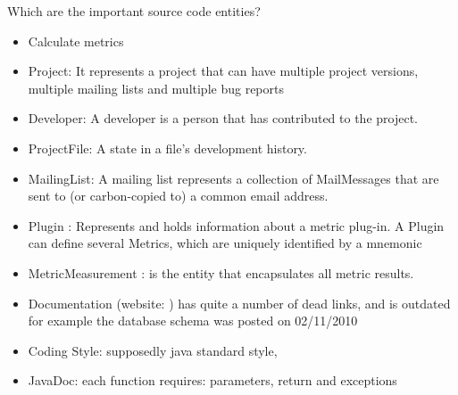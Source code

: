 \documentclass[a4paper,12pt,titlepage]{article}
\begin{document}
Which are the important source code entities?
\begin{itemize}
\item Calculate metrics %
\item Project: It represents a project that can have multiple project versions, multiple mailing lists and multiple bug reports

\item Developer: A developer is a person that has contributed to the project.

\item ProjectFile: A state in a file's development history.

\item MailingList: A mailing list represents a collection of MailMessages that are sent to (or carbon-copied to) a common email address.

\item Plugin : Represents and holds information about a metric plug-in. A Plugin can define several Metrics, which are uniquely identified by a mnemonic

\item MetricMeasurement : is the entity that encapsulates all metric results.
\end{itemize}


\begin{itemize}
\item Documentation (website: ) has quite a number of dead links, and is outdated for example the database schema was posted on 02/11/2010
\item Coding Style: supposedly java standard style, %
\item JavaDoc: each function requires: parameters, return and exceptions %
\end{itemize}


\end{document}
